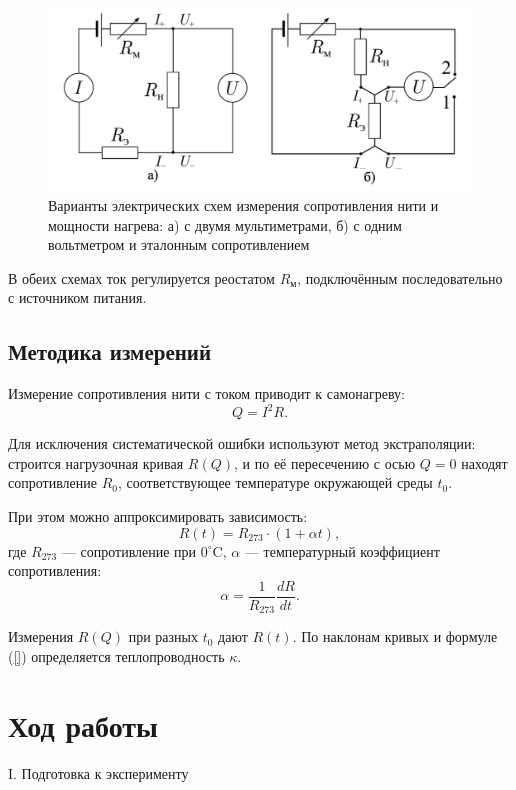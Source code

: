 \documentclass[a4paper,12pt]{article} %
\begin{document}
\begin{figure}[h!]
  \centering
  \includegraphics[scale = 0.5]{curcuit.png}
  \caption{Варианты электрических схем измерения сопротивления нити и мощности нагрева: а) с двумя мультиметрами, б) с одним вольтметром и эталонным сопротивлением}
  \label{fig:curcuit}
\end{figure}

В обеих схемах ток регулируется реостатом $R_\text{м}$, подключённым последовательно с источником питания.

\subsection*{Методика измерений}

Измерение сопротивления нити с током приводит к самонагреву:
\[
Q = I^2 R.
\]

Для исключения систематической ошибки используют метод экстраполяции: строится нагрузочная кривая $R(Q)$, и по её пересечению с осью $Q=0$ находят сопротивление $R_0$, соответствующее температуре окружающей среды $t_0$.

При этом можно аппроксимировать зависимость:
\[
R(t) = R_{273} \cdot (1 + \alpha t),
\]
где $R_{273}$ — сопротивление при $0^\circ$C, $\alpha$ — температурный коэффициент сопротивления:
\[
\alpha = \frac{1}{R_{273}} \frac{dR}{dt}.
\]

Измерения $R(Q)$ при разных $t_0$ дают $R(t)$. По наклонам кривых и формуле (\ref{}) определяется теплопроводность $\kappa$.

\section*{Ход работы}
\begin{center}
  \textsf{I. Подготовка к эксперименту}
\end{center}
\end{document}
